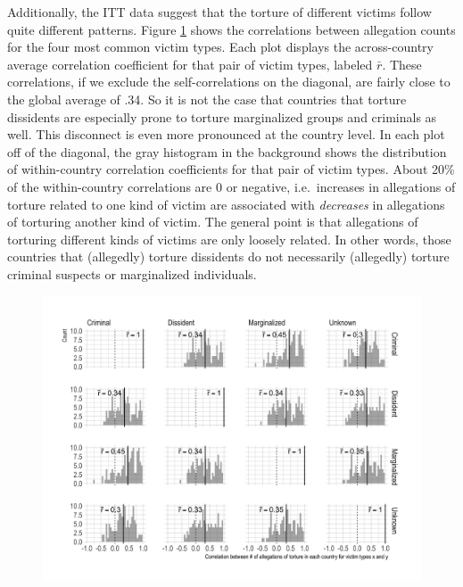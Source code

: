 \documentclass[11pt]{article}
\begin{document}
Additionally, the ITT data suggest that the torture of different victims follow quite different patterns. Figure \ref{fig:correlation-matrix} shows the correlations between allegation counts for the four most common victim types. Each plot displays the across-country average correlation coefficient for that pair of victim types, labeled $\bar{r}$. These correlations, if we exclude the self-correlations on the diagonal, are fairly close to the global average of .34. So it is not the case that countries that torture dissidents are especially prone to torture marginalized groups and criminals as well. This disconnect is even more pronounced at the country level. In each plot off of the diagonal, the gray histogram in the background shows the distribution of within-country correlation coefficients for that pair of victim types. About 20\% of the within-country correlations are 0 or negative, i.e.\ increases in allegations of torture related to one kind of victim are associated with {\em decreases} in allegations of torturing another kind of victim. The general point is that allegations of torturing different kinds of victims are only loosely related. In other words, those countries that (allegedly) torture dissidents  do not necessarily (allegedly) torture criminal suspects or marginalized individuals. 

\begin{figure}
\begin{center}
\caption{}
\label{fig:correlation-matrix}
\includegraphics[width=.99\textwidth]{../output/figures/allegations-by-victim-pairwise-correlations.png}
\end{center}
\end{figure}
\end{document}
